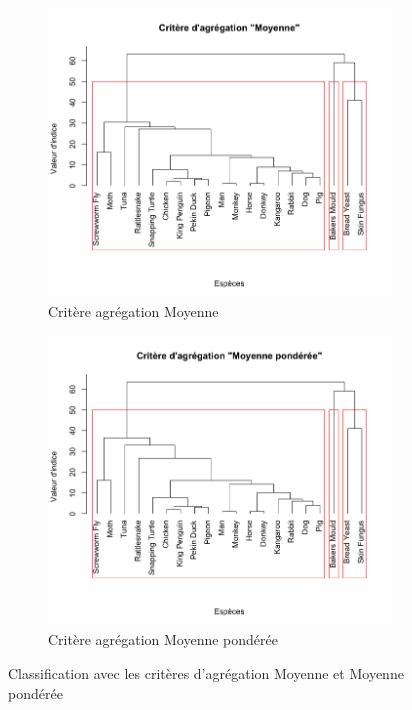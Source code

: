 \documentclass[a4paper,10pt]{report}
\begin{document}
\begin{figure}[H]
	\centering
	\captionsetup{justification=centering, margin=3cm}
	\begin{subfigure}[b]{0.4\linewidth}
		\centering
		\captionsetup{justification=centering}
		\includegraphics[width=1\linewidth]{img/2-1-mut-hierarchie-moy}
		\caption{\small Critère agrégation Moyenne}
		\label{fig:2-1-mut-hierarchie-moy}
	\end{subfigure}%
	\begin{subfigure}[b]{0.4\linewidth}
		\centering
		\captionsetup{justification=centering}
		\includegraphics[width=1\linewidth]{img/2-1-mut-hierarchie-moy-ponderee}
		\caption{\small Critère agrégation Moyenne pondérée}
		\label{fig:2-1-mut-hierarchie-moy-ponderee}
	\end{subfigure}%
	\caption{\small Classification avec les critères d'agrégation Moyenne et Moyenne pondérée}
	\label{fig:2-1-classification-mut-moy}%
\end{figure}
\end{document}
